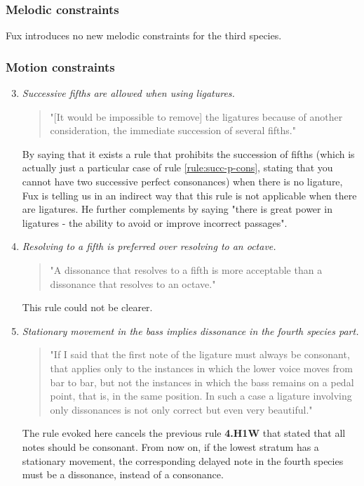\subsubsection{Melodic constraints}
Fux introduces no new melodic constraints for the third species.

\subsubsection{Motion constraints}
\begin{enumerate}[wide, label=\bfseries 4.P\arabic*]
\setcounter{enumi}{2}
    \item \textit{Successive fifths are allowed when using ligatures.} \label{rule:successive-fifths-in-4th-species}    
    \begin{quotation}
        "[It would be impossible to remove] the ligatures because of another consideration, the immediate succession of several fifths."
        \textcite[p.95]{GaPEng}
    \end{quotation}
    By saying that it exists a rule that prohibits the succession of fifths (which is actually just a particular case of rule \ref{rule:succ-p-cons}, stating that you cannot have two successive perfect consonances) when there is no ligature, Fux is telling us in an indirect way that this rule is not applicable when there are ligatures. He further complements by saying "there is great power in ligatures - the ability to avoid or improve incorrect passages". 

    \item \textit{Resolving to a fifth is preferred over resolving to an octave.} \label{rule:resolving-to-fifths-rather-than-octaves}    
    \begin{quotation}
        "A dissonance that resolves to a fifth is more acceptable than a dissonance that resolves to an octave."
        \textcite[p.98]{GaPEng}
    \end{quotation}
    This rule could not be clearer.
    
    \item \textit{Stationary movement in the bass implies dissonance in the fourth species part.} \label{rule:dissonance-in-4th-species}
    \begin{quotation}
        "If I said that the first note of the ligature must always be consonant, that applies only to the instances in which the lower voice moves from bar to bar, but not the instances in which the bass remains on a pedal point, that is, in the same position. In such a case a ligature involving only dissonances is not only correct but even very beautiful."
        \textcite[p.98]{GaPEng}
    \end{quotation}
    The rule evoked here cancels the previous rule \textbf{4.H1W} that stated that all notes should be consonant. From now on, if the lowest stratum has a stationary movement, the corresponding delayed note in the fourth species must be a dissonance, instead of a consonance.    



\end{enumerate}
